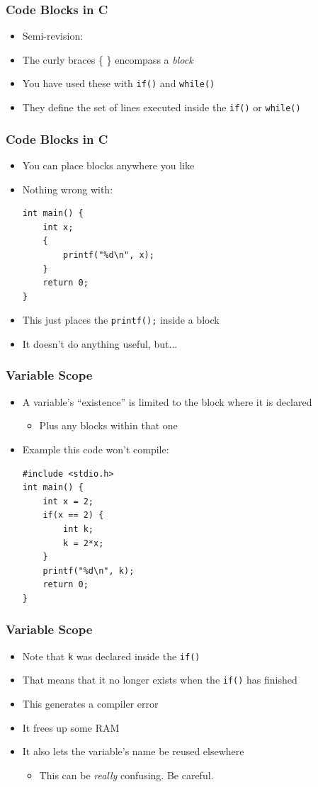 \documentclass[14pt]{beamer}
\begin{document}
\begin{frame}[fragile]
\frametitle{Code Blocks in C}
\begin{itemize}
\item Semi-revision:
\item The curly braces \{ \} encompass a \textit{block}
\item You have used these with \texttt{if()} and \texttt{while()}
\item They define the set of lines executed inside the \texttt{if()} or \texttt{while()}

\end{itemize}
\end{frame}

\begin{frame}[fragile]
\frametitle{Code Blocks in C}
\begin{itemize}
\item You can place blocks anywhere you like
\item Nothing wrong with:
\begin{lstlisting}[style=CStyle]
int main() {
	int x;
	{
		printf("%d\n", x);
	}
	return 0;
}
\end{lstlisting}
\item This just places the \texttt{printf();} inside a block
\item It doesn't do anything useful, but...
\end{itemize}
\end{frame}

\begin{frame}[fragile]
\frametitle{Variable Scope}
\begin{itemize}
\item A variable's ``existence'' is limited to the block where it is declared
	\begin{itemize}
		\item Plus any blocks within that one
	\end{itemize}
\item Example this code won't compile:
\begin{lstlisting}[style=CStyle]
#include <stdio.h>
int main() {
	int x = 2;
	if(x == 2) {
		int k;
		k = 2*x;
	}
	printf("%d\n", k);
	return 0;
}
\end{lstlisting}
\end{itemize}
\end{frame}

\begin{frame}
\frametitle{Variable Scope}
\begin{itemize}
\item Note that \texttt{k} was declared inside the \texttt{if()}
\item That means that it no longer exists when the \texttt{if()} has finished
\item This generates a compiler error
\item It frees up some RAM
\item It also lets the variable's name be reused elsewhere
	\begin{itemize}
		\item This can be \textit{really} confusing. Be careful.
	\end{itemize}
\end{itemize}
\end{frame}
\end{document}
